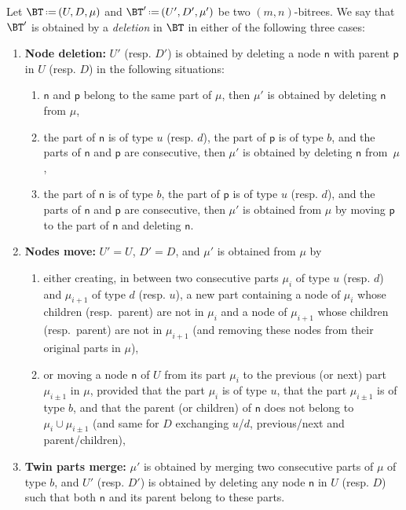 \documentclass[AHL,Unicode,longabstracts,published]{cedram}
\newcommand{\eqdef}{\mbox{\,\raisebox{0.2ex}{\scriptsize\ensuremath{\mathrm:}}\ensuremath{=}\,}}
\newcommand{\node}[1]{\mathsf{#1}}
\newcommand*{\romanenumi}{\renewcommand*{\theenumi}{\roman{enumi}}}
\newcommand*{\alphenumi}{\renewcommand*{\theenumi}{\alph{enumi}}}
\begin{document}
\begin{defi}\label{def:bitreeDeletion}
Let $\BT \eqdef (U, D, \mu)$ and $\BT' \eqdef (U', D', \mu')$ be two $(m,n)$-bitrees. We say that $\BT'$ is obtained by a
\emph{deletion} in $\BT$ in either of the following three cases:
\begin{enumerate}\romanenumi
\item\label{defi5.2.1} \textbf{Node deletion:} $U'$ (resp. $D'$) is obtained by deleting a node $\node{n}$ with parent $\node{p}$ in $U$ (resp. $D$) in the following situations:
\begin{enumerate}\alphenumi
\item \label{defi5.2.1.a}$\node{n}$ and $\node{p}$ belong to the same part of $\mu$, then $\mu'$ is obtained by deleting $\node{n}$ from $\mu$,
\item\label{defi5.2.1.b} the part of $\node{n}$ is of type $u$ (resp. $d$), the part of $\node{p}$ is of type $b$, and the parts of $\node{n}$ and $\node{p}$ are consecutive, then $\mu'$ is obtained by deleting $\node{n}$ from~$\mu$,
\item\label{defi5.2.1.c} the part of $\node{n}$ is of type $b$, the part of $\node{p}$ is of type $u$ (resp. $d$), and the parts of $\node{n}$ and $\node{p}$ are consecutive, then $\mu'$ is obtained from $\mu$ by moving $\node{p}$ to the part of $\node{n}$ and deleting $\node{n}$.
\end{enumerate}
\item\label{defi5.2.2} \textbf{Nodes move:} $U' = U$, $D' = D$, and $\mu'$ is obtained from $\mu$ by
\begin{enumerate}\alphenumi
\item\label{defi5.2.2.a} either creating, in between two consecutive parts $\mu_i$ of type $u$ (resp. $d$) and $\mu_{i+1}$ of type $d$ (resp. $u$), a new part containing a node of $\mu_i$ whose children (resp.~parent) are not in $\mu_i$ and a node of $\mu_{i+1}$ whose children (resp.~parent) are not in $\mu_{i+1}$ (and removing these nodes from their original parts in $\mu$),
\item\label{defi5.2.2.b} or moving a node $\node{n}$ of $U$ from its part $\mu_i$ to the previous (or next) part~$\mu_{i \pm 1}$ in $\mu$, provided that the part $\mu_i$ is of type $u$, that the part $\mu_{i \pm 1}$ is of type $b$, and that the parent (or children) of $\node{n}$ does not belong to $\mu_i \cup \mu_{i \pm 1}$ (and same for $D$ exchanging $u$/$d$, previous/next and parent/children),
\end{enumerate}
\item\label{defi5.2.3} \textbf{Twin parts merge:} $\mu'$ is obtained by merging two consecutive parts of $\mu$ of type $b$, and $U'$ (resp. $D'$) is obtained by deleting any node $\node{n}$ in $U$ (resp. $D$) such that both $\node{n}$ and its parent belong to these parts.
\end{enumerate}
\end{defi}
\end{document}
